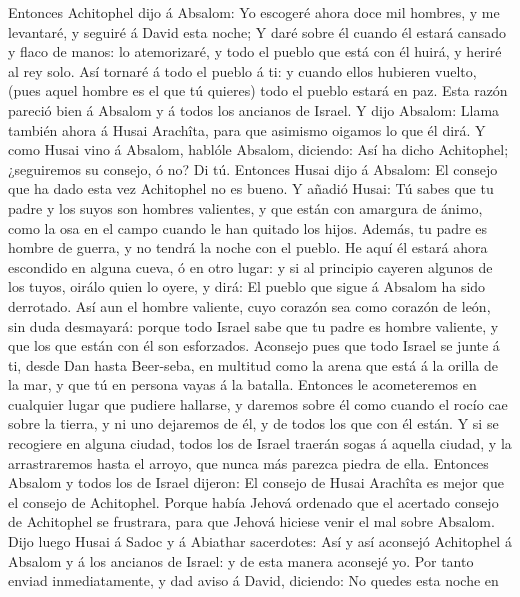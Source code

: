  Entonces Achitophel dijo á Absalom: Yo escogeré ahora doce
mil hombres, y me levantaré, y seguiré á David esta noche; 
Y daré sobre él cuando él estará cansado y flaco de manos: lo
atemorizaré, y todo el pueblo que está con él huirá, y heriré al rey
solo.  Así tornaré á todo el pueblo á ti: y cuando ellos
hubieren vuelto, (pues aquel hombre es el que tú quieres) todo el pueblo
estará en paz.  Esta razón pareció bien á Absalom y á todos
los ancianos de Israel.  Y dijo Absalom: Llama también ahora
á Husai Arachîta, para que asimismo oigamos lo que él dirá. 
Y como Husai vino á Absalom, hablóle Absalom, diciendo: Así ha dicho
Achitophel; ¿seguiremos su consejo, ó no? Di tú.  Entonces
Husai dijo á Absalom: El consejo que ha dado esta vez Achitophel no es
bueno.  Y añadió Husai: Tú sabes que tu padre y los suyos
son hombres valientes, y que están con amargura de ánimo, como la osa en
el campo cuando le han quitado los hijos. Además, tu padre es hombre de
guerra, y no tendrá la noche con el pueblo.  He aquí él
estará ahora escondido en alguna cueva, ó en otro lugar: y si al
principio cayeren algunos de los tuyos, oirálo quien lo oyere, y dirá:
El pueblo que sigue á Absalom ha sido derrotado.  Así aun
el hombre valiente, cuyo corazón sea como corazón de león, sin duda
desmayará: porque todo Israel sabe que tu padre es hombre valiente, y
que los que están con él son esforzados.  Aconsejo pues que
todo Israel se junte á ti, desde Dan hasta Beer-seba, en multitud como
la arena que está á la orilla de la mar, y que tú en persona vayas á la
batalla.  Entonces le acometeremos en cualquier lugar que
pudiere hallarse, y daremos sobre él como cuando el rocío cae sobre la
tierra, y ni uno dejaremos de él, y de todos los que con él están.
 Y si se recogiere en alguna ciudad, todos los de Israel
traerán sogas á aquella ciudad, y la arrastraremos hasta el arroyo, que
nunca más parezca piedra de ella.  Entonces Absalom y todos
los de Israel dijeron: El consejo de Husai Arachîta es mejor que el
consejo de Achitophel. Porque había Jehová ordenado que el acertado
consejo de Achitophel se frustrara, para que Jehová hiciese venir el mal
sobre Absalom.  Dijo luego Husai á Sadoc y á Abiathar
sacerdotes: Así y así aconsejó Achitophel á Absalom y á los ancianos de
Israel: y de esta manera aconsejé yo.  Por tanto enviad
inmediatamente, y dad aviso á David, diciendo: No quedes esta noche en
